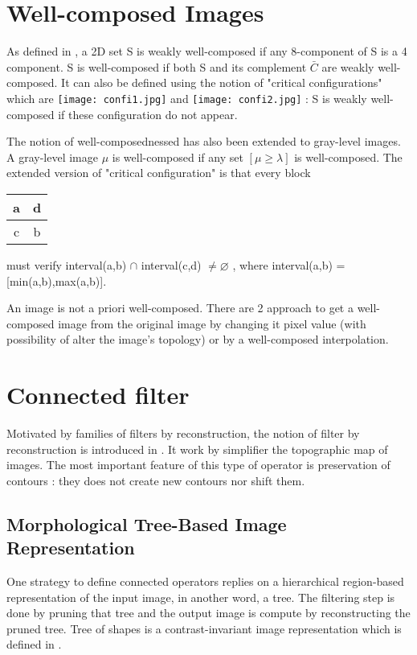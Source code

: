 \section{Well-composed Images}
\par
As defined in \cite{Latecki95}, a 2D set S is weakly well-composed if any 8-component of S is a 4 component. S is well-composed if both S and its complement $\bar{C}$ are weakly well-composed. It can also be defined using the notion of "critical configurations" which are \texttt{[image: confi1.jpg]} and \texttt{[image: confi2.jpg]} : S is weakly well-composed if these configuration do not appear.
\par
The notion of well-composednessed has also been extended to gray-level images. A gray-level image $\mu$ is well-composed if any set $[\mu \geq \lambda ]$ is well-composed. The extended version of "critical configuration" is that every block 
\begin{tabular}{|c|c|}
\hline 
a & d \\ 
\hline 
c & b \\ 
\hline 
\end{tabular} 
must verify interval(a,b) $\cap$ interval(c,d) $\neq \varnothing$ , where interval(a,b) = [min(a,b),max(a,b)].
\par
An image is not a priori well-composed. There are 2 approach to get a well-composed image from the original image \cite{Geraud.15.ismm} by changing it pixel value (with possibility of alter the image's topology) or by a well-composed interpolation.



\section{Connected filter}
Motivated by families of filters by reconstruction, the notion of filter by reconstruction is introduced in \cite{Salembier95flatzones} \cite{Serra1993}. It work by simplifier the topographic map of images. The most important feature of this type of operator is preservation of contours \cite{Salembier2009}: they does not create new contours nor shift them.
\subsection{Morphological Tree-Based Image Representation}
One strategy to define connected operators replies on a hierarchical region-based representation of the input image, in another word, a tree. The filtering step is done by pruning that tree and the output image is compute by reconstructing the pruned tree.  Tree of shapes is a contrast-invariant image representation which is defined in \cite{Monasse.2000}.
